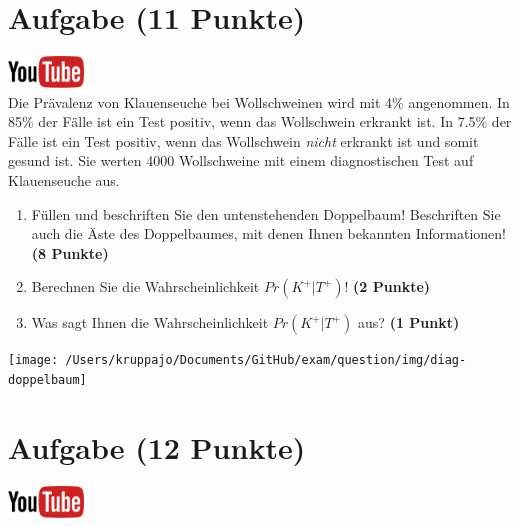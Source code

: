 \documentclass[a4paper, 10pt]{scrartcl}\usepackage[]{graphicx}\usepackage[]{xcolor}
\begin{document}
\section{Aufgabe \hfill (11 Punkte)}

\hfill\href{https://youtu.be/VQlNl8hvRII}{\includegraphics[width =
  2cm]{img/youtube}}\\[1Ex]


Die Pr{\"a}valenz von Klauenseuche bei Wollschweinen wird mit
4\% angenommen. In 85\% der F{\"a}lle ist ein Test positiv, wenn das Wollschwein erkrankt
ist. In 7.5\% der F{\"a}lle ist ein Test positiv,
wenn das Wollschwein \textit{nicht} erkrankt ist und somit gesund ist. Sie
werten 4000 Wollschweine mit einem
diagnostischen Test auf Klauenseuche aus.



\begin{enumerate}
\item F{\"u}llen und beschriften Sie den untenstehenden Doppelbaum! Beschriften
  Sie auch die {\"A}ste des Doppelbaumes, mit denen Ihnen bekannten
  Informationen!  \textbf{(8 Punkte)}
\item Berechnen Sie die Wahrscheinlichkeit $Pr(K^+|T^+)$! \textbf{(2 Punkte)}
\item Was sagt Ihnen die Wahrscheinlichkeit $Pr(K^+|T^+)$ aus? \textbf{(1 Punkt)}
\end{enumerate}

\vspace{1cm}

\begin{center}
  \texttt{[image: /Users/kruppajo/Documents/GitHub/exam/question/img/diag-doppelbaum]}
\end{center}



 
\clearpage

\section{Aufgabe \hfill (12 Punkte)}


\hfill\href{https://youtu.be/_7s44pbOc00}{\includegraphics[width =
  2cm]{img/youtube}}\\[1Ex]
\end{document}
